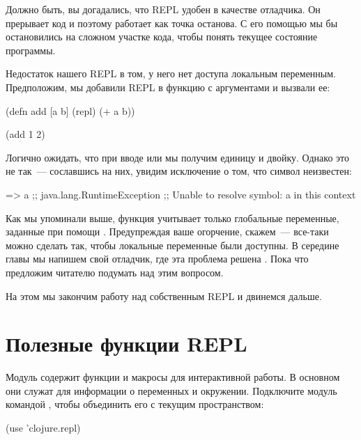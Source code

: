 Должно быть, вы догадались, что REPL удобен в качестве отладчика. Он прерывает код и поэтому работает как точка останова. С его помощью мы бы остановились на сложном участке кода, чтобы понять текущее состояние программы.

Недостаток нашего REPL в том, у него нет доступа локальным переменным. Предположим, мы добавили REPL в функцию с аргументами и вызвали ее:

\begin{english}
  \begin{clojure}
(defn add [a b]
  (repl)
  (+ a b))

(add 1 2)
  \end{clojure}
\end{english}

Логично ожидать, что при вводе  или  мы получим единицу и двойку. Однако это не так~--- сославшись на них, увидим исключение о том, что символ неизвестен:

\begin{english}
  \begin{clojure}
=> a
;; java.lang.RuntimeException
;; Unable to resolve symbol: a in this context
  \end{clojure}
\end{english}

Как мы упоминали выше, функция  учитывает только глобальные переменные, заданные при помощи . Предупреждая ваше огорчение, скажем~--- все-таки можно сделать так, чтобы локальные переменные были доступны. В середине главы мы напишем свой отладчик, где эта проблема решена . Пока что предложим читателю подумать над этим вопросом.

На этом мы закончим работу над собственным REPL и двинемся дальше.

\section{Полезные функции REPL}

Модуль  содержит функции и макросы для интерактивной работы. В основном они служат для информации о переменных и окружении. Подключите модуль командой , чтобы объединить его с текущим пространством:

\begin{english}
  \begin{clojure}
(use 'clojure.repl)
  \end{clojure}
\end{english}

